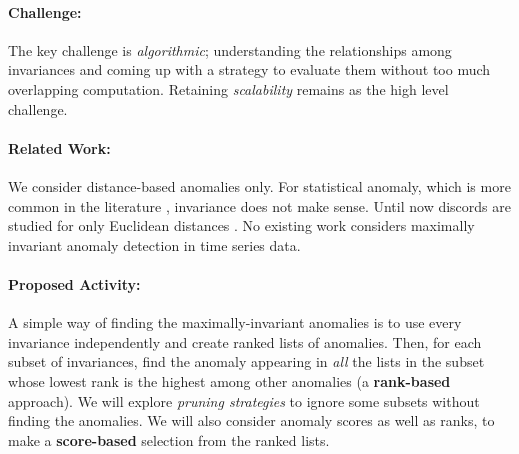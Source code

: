 
\paragraph{Challenge:} 

The key challenge is {\it algorithmic}; understanding the relationships among invariances and coming up with a strategy to evaluate them without too much overlapping computation. Retaining {\it scalability} remains as the high level challenge. %



\paragraph{Related Work:}


We consider distance-based anomalies only. For statistical anomaly, which is more common in the literature \cite{Guttman,Grubbs,Chandola:09}, invariance does not make sense. Until now discords are studied for only Euclidean distances \cite{Yankov:07a,Li:13a,Luo:13}. No existing work considers maximally invariant anomaly detection in time series data. 


\paragraph{Proposed Activity:}

A simple way of finding the maximally-invariant anomalies is to use every invariance independently and create ranked lists of anomalies. Then, for each subset of invariances, find the anomaly appearing in {\it all} the lists in the subset whose lowest rank is the highest among other anomalies (a {\bf rank-based} approach). We will explore {\it pruning strategies} to ignore some subsets without finding the anomalies. We will also consider anomaly scores as well as ranks, to make a {\bf score-based} selection from the ranked lists.



